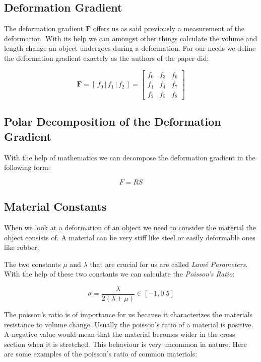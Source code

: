 \subsection{Deformation Gradient}
The deformation gradient \textbf{F} offers us as said previously a measurement of the deformation. With its help we can amongst other things calculate the volume and length change an object undergoes during a deformation. For our needs we define the deformation gradient exactely as the authors of the paper \cite{Smith:2018:SNF:3191713.3180491} did:

\[
\textbf{F} = \left[ \,f_0\, \bigg| \,f_1\, \bigg| \,f_2\, \right] = \begin{bmatrix} f_0 & f_3 & f_6 \\ f_1 & f_4 & f_7 \\ f_2 & f_5 & f_8 \end{bmatrix}
\]



\subsection{Polar Decomposition of the Deformation Gradient}
With the help of mathematics we can decompose the deformation gradient in the following form:

\[
F = R S
\]




\subsection{Material Constants}
When we look at a deformation of an object we need to consider the material the object consists of. A material can be very stiff like steel or easily deformable ones like robber. 

The two constants $\mu$ and $\lambda$ that are crucial for us are called \textit{Lamé Parameters}. With the help of these two constants we can calculate the \textit{Poisson's Ratio}:

\[ \sigma =  \frac{\lambda}{2(\lambda + \mu)} \in [-1, 0.5] \]

The poisson's ratio is of importance for us because it characterizes the materials resistance to volume change. Usually the poisson's ratio of a material is positive. A negative value would mean that the material becomes wider in the cross section when it is stretched. This behaviour is very uncommon in nature. Here are some examples of the poisson's ratio of common materials:

